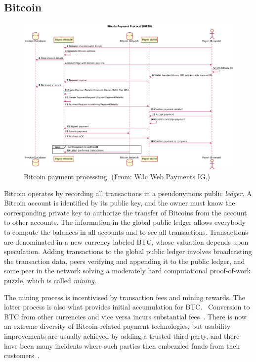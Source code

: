 \documentclass{llncs}
\begin{document}

\subsection{Bitcoin}

\begin{figure}[b!]
\includegraphics[width=\textwidth]{figs/bitcoin.pdf}
\caption{Bitcoin payment processing. (From: W3c Web Payments IG.)}
\label{fig:bitcoin}
\end{figure}

Bitcoin operates by recording all transactions in a pseu\-do\-ny\-mous
public {\em ledger}.  A Bitcoin account is identified by its public
key, and the owner must know the corresponding private key to authorize
the transfer of Bitcoins from the account to
other accounts.  The information in the global public ledger allows
everybody to compute the balances in all accounts and to see all
transactions.  Transactions are denominated in a new currency labeled
BTC, whose valuation depends upon speculation.  Adding transactions to
the global public ledger involves broadcasting the transaction data,
peers verifying and appending it to the public ledger, and some peer
in the network solving a moderately hard computational proof-of-work
puzzle, which is called {\em mining}.

The mining process is incentivised by transaction fees and mining
rewards. The latter process is also what provides initial accumulation
for BTC.~\cite{nakamoto2008bitcoin} Conversion to BTC from
other currencies and vice versa incurs substantial fees~\cite{BTCfees}.
There is now an extreme diversity of Bitcoin-related payment
technologies, but usability improvements are usually achieved by
adding a trusted third party, and there have been many incidents
where such parties then embezzled funds from their customers~\cite{BTC:demise}.
\end{document}
